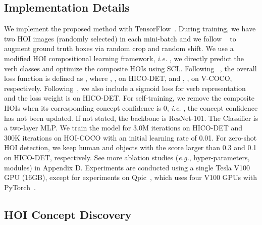 \documentclass[runningheads]{llncs}
\newcommand{\ie}{\textit{i.e. }}
\newcommand{\eg}{\textit{e.g.}}
\begin{document}
\subsection{Implementation Details}
\label{sec:impl_detail}
We implement the proposed method with TensorFlow~\cite{abadi2016tensorflow}.
During training, we have two HOI images (randomly selected) in each mini-batch and we follow ~\cite{gao2018ican} to augment ground truth boxes via random crop and random shift. We use a modified HOI compositional learning framework, \ie, we directly predict the verb classes and optimize the composite HOIs using SCL. Following ~\cite{hou2020visual,hou2021fcl}, the overall loss function is defined as , where , ,  on HICO-DET, and , ,  on V-COCO, respectively. Following~\cite{hou2021fcl}, we also include a sigmoid loss for verb representation and the loss weight is  on HICO-DET.
For self-training, we remove the composite HOIs when its corresponding concept confidence is 0, \ie, the concept confidence has not been updated. If not stated, the backbone is ResNet-101. The Classifier is a two-layer MLP. We train the model for 3.0M iterations on HICO-DET and 300K iterations on HOI-COCO with an initial learning rate of 0.01. For zero-shot HOI detection, we keep human and objects with the score larger than 0.3 and 0.1 on HICO-DET, respectively. See more ablation studies (\eg, hyper-parameters, modules) in Appendix D. Experiments are conducted using a single Tesla V100 GPU (16GB), except for experiments on Qpic~\cite{tamura_cvpr2021}, which uses four V100 GPUs with PyTorch~\cite{NEURIPS2019_9015}.



\subsection{HOI Concept Discovery}
\end{document}
